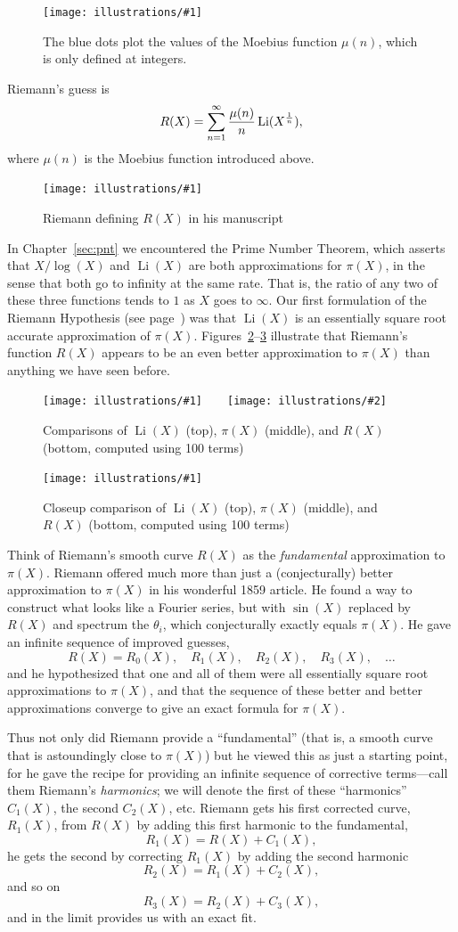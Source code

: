 \documentclass[openany]{book}
\DeclareMathOperator{\Li}{Li}
\newcommand{\ill}[3]{%
   \begin{figure}[H]%
   \vspace{-2ex}
   \centering%
   \texttt{[image: illustrations/\#1]}%
   \caption{#3}%
   \vspace{-2ex}
    \end{figure}}
\newcommand{\illtwo}[4]{%
   \begin{figure}[H]\centering%
   \texttt{[image: illustrations/\#1]}$\qquad$\texttt{[image: illustrations/\#2]}%
   \caption{#4}%
    \end{figure}}
\theoremstyle{plain}
\theoremstyle{definition}
\newcommand{\RH}{Riemann Hypothesis\index{Riemann Hypothesis}}
\begin{document}
{{\ill{moebius}{1}{The blue dots plot the values of the Moebius function $\mu(n)$, which is only defined at integers.\label{fig:moebius}}


Riemann's guess is
$$
R(X) = \sum_{n=1}^{\infty}{\mu(n)\over n} \Li(X^{1\over n}),
$$
where $\mu(n)$ is the Moebius function introduced above.

\ill{riemann_RX}{0.8}{Riemann defining $R(X)$ in his manuscript}

In Chapter~\ref{sec:pnt} we encountered the Prime Number Theorem, which
asserts that $X/\log(X)$ and $\Li(X)$ are both approximations for
$\pi(X)$, in the sense that both go to infinity at the same rate.  That is, the ratio of any two of these three functions tends to $1$ as $X$ goes to $\infty$.
Our first formulation of the \RH{} (see page~\pageref{rh:first}) was
that $\Li(X)$ is an essentially square root accurate approximation of
$\pi(X)$.  Figures~\ref{fig:guess100}--\ref{fig:guess10000} illustrate
that Riemann's function $R(X)$ appears to be an even better
approximation to $\pi(X)$ than anything we have seen before.

\illtwo{pi_riemann_gauss_100}{pi_riemann_gauss_1000}{0.47}{Comparisons of $\Li(X)$ (top), $\pi(X)$ (middle), and $R(X)$ (bottom, computed using 100 terms)\label{fig:guess100}}


\ill{pi_riemann_gauss_10000-11000}{0.5}{Closeup comparison of  $\Li(X)$ (top), $\pi(X)$ (middle), and $R(X)$ (bottom, computed using 100 terms)\label{fig:guess10000}}


Think of Riemann's smooth curve $R(X)$ as the {\em fundamental}
approximation to $\pi(X)$.
Riemann offered much more than just a (conjecturally) better
approximation to $\pi(X)$ in his wonderful 1859 article.
He found a way to construct what looks like a Fourier series,
but with $\sin(X)$ replaced by $R(X)$ and spectrum the $\theta_i$, which
conjecturally exactly equals $\pi(X)$.
He gave an infinite sequence of improved guesses,
$$
R(X) = R_0(X),\quad R_1(X), \quad R_2(X), \quad R_3(X), \quad \ldots
$$
and he hypothesized that one and all of them were all
essentially square root approximations to $\pi(X)$,
and that the sequence of these better and better approximations converge to give an exact formula
for $\pi(X)$.

Thus not only did Riemann provide a ``fundamental'' (that is, a smooth curve
that is astoundingly close to $\pi(X)$) but he viewed this as just a
starting point, for he gave the recipe for providing an infinite
sequence of corrective terms---call them Riemann's {\em harmonics}; we
will denote the first of these ``harmonics'' $C_1(X)$, the second
$C_2(X)$, etc.  Riemann gets his first corrected curve, $R_1(X)$, from
$R(X)$ by adding this first harmonic to the fundamental, $$R_1(X) =
R(X) + C_1(X),$$ he gets the second by correcting $R_1(X)$ by adding
the second harmonic $$R_2(X) = R_1 (X) + C_2(X),$$ and so on $$R_3(X)
= R_2 (X) + C_3(X),$$ and in the limit provides us with an exact fit.

}}
\end{document}
